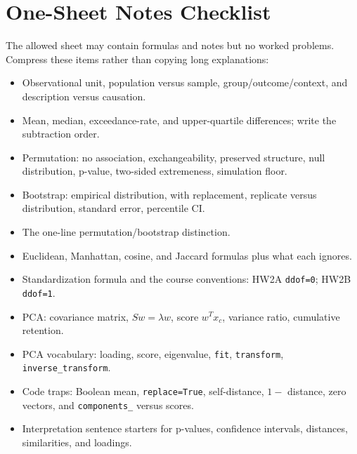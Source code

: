 \documentclass[11pt]{article}
\begin{document}
\section{One-Sheet Notes Checklist}
The allowed sheet may contain formulas and notes but no worked problems. Compress these items rather than copying long explanations:
\begin{itemize}
	\item Observational unit, population versus sample, group/outcome/context, and description versus causation.
	\item Mean, median, exceedance-rate, and upper-quartile differences; write the subtraction order.
	\item Permutation: no association, exchangeability, preserved structure, null distribution, p-value, two-sided extremeness, simulation floor.
	\item Bootstrap: empirical distribution, with replacement, replicate versus distribution, standard error, percentile CI.
	\item The one-line permutation/bootstrap distinction.
	\item Euclidean, Manhattan, cosine, and Jaccard formulas plus what each ignores.
	\item Standardization formula and the course conventions: HW2A \texttt{ddof=0}; HW2B \texttt{ddof=1}.
	\item PCA: covariance matrix, $Sw=\lambda w$, score $w^Tx_c$, variance ratio, cumulative retention.
	\item PCA vocabulary: loading, score, eigenvalue, \texttt{fit}, \texttt{transform}, \texttt{inverse\_transform}.
	\item Code traps: Boolean mean, \texttt{replace=True}, self-distance, $1-$ distance, zero vectors, and \texttt{components\_} versus scores.
	\item Interpretation sentence starters for p-values, confidence intervals, distances, similarities, and loadings.
\end{itemize}
\end{document}
